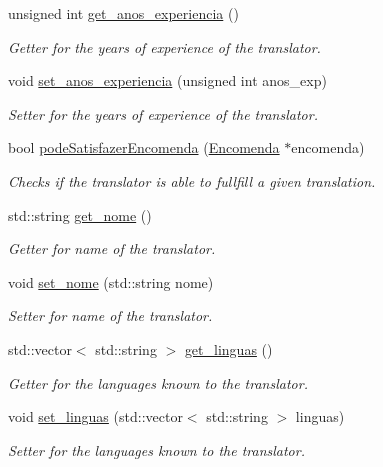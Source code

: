 \begin{DoxyCompactItemize}
unsigned int \hyperlink{class_tradutor_a001f11f69661085cb11192d3c6f5d556}{get\-\_\-anos\-\_\-experiencia} ()
\begin{DoxyCompactList}\small\item\em Getter for the years of experience of the translator. \end{DoxyCompactList}\item 
void \hyperlink{class_tradutor_a938cfc1c263b3504fc4d7fbdc939b087}{set\-\_\-anos\-\_\-experiencia} (unsigned int anos\-\_\-exp)
\begin{DoxyCompactList}\small\item\em Setter for the years of experience of the translator. \end{DoxyCompactList}\item 
bool \hyperlink{class_tradutor_a1d22a38c8eaa3753d44b521bb3aab2af}{pode\-Satisfazer\-Encomenda} (\hyperlink{class_encomenda}{Encomenda} $\ast$encomenda)
\begin{DoxyCompactList}\small\item\em Checks if the translator is able to fullfill a given translation. \end{DoxyCompactList}\item 
std\-::string \hyperlink{class_tradutor_a3547a7d337cd421be409e5bf63418964}{get\-\_\-nome} ()
\begin{DoxyCompactList}\small\item\em Getter for name of the translator. \end{DoxyCompactList}\item 
void \hyperlink{class_tradutor_aa50fdceab0ca03dfe5c2a1639bc5869e}{set\-\_\-nome} (std\-::string nome)
\begin{DoxyCompactList}\small\item\em Setter for name of the translator. \end{DoxyCompactList}\item 
std\-::vector$<$ std\-::string $>$ \hyperlink{class_tradutor_a011b86fa2dae11c6ccdda1cbeb844e94}{get\-\_\-linguas} ()
\begin{DoxyCompactList}\small\item\em Getter for the languages known to the translator. \end{DoxyCompactList}\item 
void \hyperlink{class_tradutor_a83ed5b48e00f3a15c579e209bb01d53f}{set\-\_\-linguas} (std\-::vector$<$ std\-::string $>$ linguas)
\begin{DoxyCompactList}\small\item\em Setter for the languages known to the translator. \end{DoxyCompactList}\end{DoxyCompactItemize}
